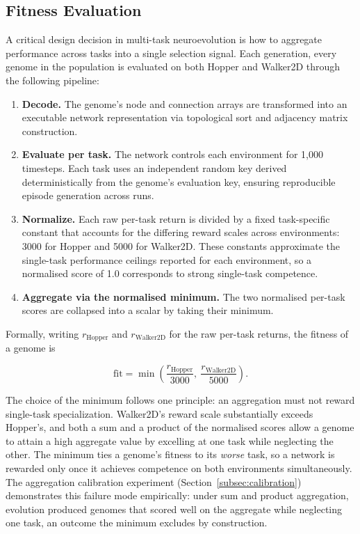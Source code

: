 \documentclass[12pt]{article}
\begin{document}
\subsection{Fitness Evaluation}
\label{subsec:fitness-evaluation}

A critical design decision in multi-task neuroevolution is how to aggregate performance across tasks into a single selection signal.
Each generation, every genome in the population is evaluated on both Hopper and Walker2D through the following pipeline:

\begin{enumerate}
    \item \textbf{Decode.} The genome's node and connection arrays are transformed into an executable network representation via topological sort and adjacency matrix construction.
    \item \textbf{Evaluate per task.} The network controls each environment for 1,000 timesteps. Each task uses an independent random key derived deterministically from the genome's evaluation key, ensuring reproducible episode generation across runs.
    \item \textbf{Normalize.} Each raw per-task return is divided by a fixed task-specific constant that accounts for the differing reward scales across environments: 3000 for Hopper and 5000 for Walker2D. These constants approximate the single-task performance ceilings reported for each environment, so a normalised score of 1.0 corresponds to strong single-task competence.
    \item \textbf{Aggregate via the normalised minimum.} The two normalised per-task scores are collapsed into a scalar by taking their minimum.
\end{enumerate}

Formally, writing $r_{\text{Hopper}}$ and $r_{\text{Walker2D}}$ for the raw per-task returns, the fitness of a genome is

\[\text{fit} = \min\!\left(\frac{r_{\text{Hopper}}}{3000},\ \frac{r_{\text{Walker2D}}}{5000}\right).\]

The choice of the minimum follows one principle: an aggregation must not reward single-task specialization.
Walker2D's reward scale substantially exceeds Hopper's, and both a sum and a product of the normalised scores allow a genome to attain a high aggregate value by excelling at one task while neglecting the other.
The minimum ties a genome's fitness to its \emph{worse} task, so a network is rewarded only once it achieves competence on both environments simultaneously.
The aggregation calibration experiment (Section~\ref{subsec:calibration}) demonstrates this failure mode empirically: under sum and product aggregation, evolution produced genomes that scored well on the aggregate while neglecting one task, an outcome the minimum excludes by construction.
\end{document}
